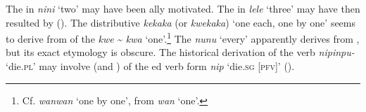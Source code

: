 

The  in \textit{nini} ‘two’ may have been ally motivated. The  in \textit{lele} ‘three’ may have then resulted by  (). The distributive  \textit{kekaka} (or \textit{kwekaka}) ‘one each, one by one’ seems to derive from  of the  \textit{kwe} {\textasciitilde} \textit{kwa} ‘one’.\footnote{Cf.  \textit{wanwan} ‘one by one’, from \textit{wan} ‘one’.} The  \textit{nunu} ‘every’ apparently derives from , but its exact etymology is obscure. The historical derivation of the  verb \textit{nipinpu-} ‘die.\textsc{pl}’ may involve  (and ) of the ed verb form \textit{nip} ‘die.\textsc{sg} \textsc{[pfv]}’ ().

